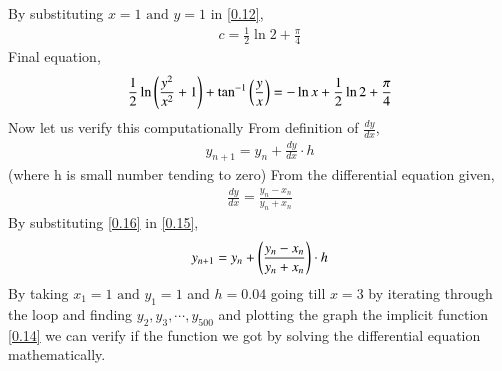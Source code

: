 \documentclass[journal]{IEEEtran}
\begin{document}
By substituting $x=1 \text{ and } y=1$ in \ref{0.12},
\begin{align}
    c = \frac{1}{2}\ln{2} + \frac{\pi}{4}
\end{align}
Final equation,
\begin{align}
    \frac{1}{2}\ln \left(\frac{y^2}{x^2}+1\right) + \tan^{-1}{\left(\frac{y}{x}\right)} = - \ln{x} + \frac{1}{2}\ln{2} + \frac{\pi}{4}
    \label{0.14}
\end{align}
Now let us verify this computationally
From definition of $\frac{dy}{dx}$,
\begin{align}
    y_{n+1}=y_{n}+\frac{dy}{dx}\cdot h
    \label{0.15}
\end{align}
(where h is small number tending to zero)
From the differential equation given,
\begin{align}
    \frac{dy}{dx}=\frac{y_n-x_n}{y_n+x_n}
    \label{0.16}
\end{align}
By substituting \ref{0.16} in \ref{0.15},
\begin{align}
    y_{n+1}=y_{n}+\left(\frac{y_n-x_n}{y_n+x_n}\right)\cdot h
\end{align}
By taking $x_1=1 \text{ and } y_1=1$  and $h=0.04$ going till $x=3$ by iterating through the loop and finding $y_2,y_3,\cdots , y_{500}$ and plotting the graph the implicit function \ref{0.14} we can verify if the function we got by solving the differential equation mathematically.
\end{document}
